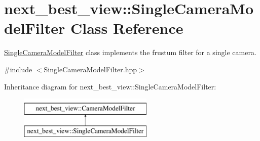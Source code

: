 \hypertarget{classnext__best__view_1_1SingleCameraModelFilter}{\section{next\-\_\-best\-\_\-view\-:\-:\-Single\-Camera\-Model\-Filter \-Class \-Reference}
\label{classnext__best__view_1_1SingleCameraModelFilter}
}


\hyperlink{classnext__best__view_1_1SingleCameraModelFilter}{\-Single\-Camera\-Model\-Filter} class implements the frustum filter for a single camera.  




{\ttfamily \#include $<$\-Single\-Camera\-Model\-Filter.\-hpp$>$}

\-Inheritance diagram for next\-\_\-best\-\_\-view\-:\-:\-Single\-Camera\-Model\-Filter\-:\begin{figure}[H]
\begin{center}
\leavevmode
\includegraphics[height=2.000000cm]{classnext__best__view_1_1SingleCameraModelFilter}
\end{center}
\end{figure}
